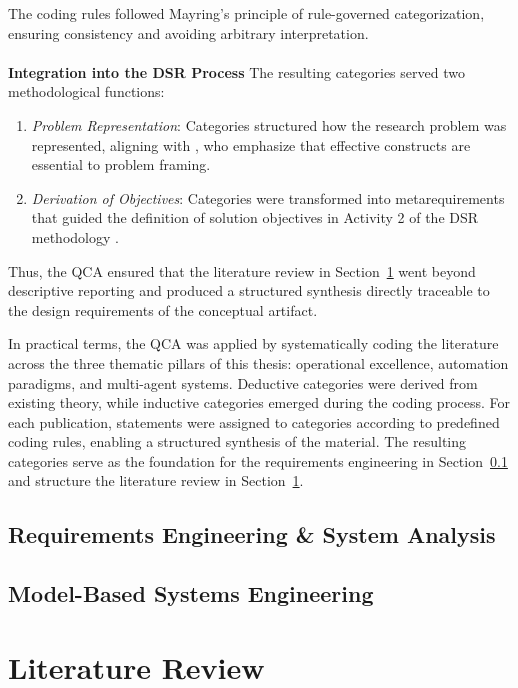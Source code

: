 The coding rules followed Mayring’s principle of rule-governed categorization, ensuring consistency and avoiding arbitrary interpretation.\\\\
\textbf{Integration into the DSR Process} \quad The resulting categories served two methodological functions:
\begin{enumerate}
    \item \textit{Problem Representation}: Categories structured how the research problem was represented, aligning with \textcite{hevnerDesignScienceInformation2004}, who emphasize that effective constructs are essential to problem framing.
    \item \textit{Derivation of Objectives}: Categories were transformed into metarequirements that guided the definition of solution objectives in Activity 2 of the DSR methodology \parencite{peffersDesignScienceMethodology2007}.
\end{enumerate}

Thus, the QCA ensured that the literature review in Section~\ref{sec:lit-rev} went beyond descriptive reporting and produced a structured synthesis directly traceable to the design requirements of the conceptual artifact.

In practical terms, the QCA was applied by systematically coding the literature across the three thematic pillars of this thesis: operational excellence, automation paradigms, and multi-agent systems. Deductive categories were derived from existing theory, while inductive categories emerged during the coding process. For each publication, statements were assigned to categories according to predefined coding rules, enabling a structured synthesis of the material. The resulting categories serve as the foundation for the requirements engineering in Section~\ref{subsec:re-sa} and structure the literature review in Section~\ref{sec:lit-rev}.\clearpage

\subsection{Requirements Engineering \& System Analysis}\label{subsec:re-sa}

\subsection{Model-Based Systems Engineering}\label{subsec:mbse}

\section{Literature Review}\label{sec:lit-rev}

